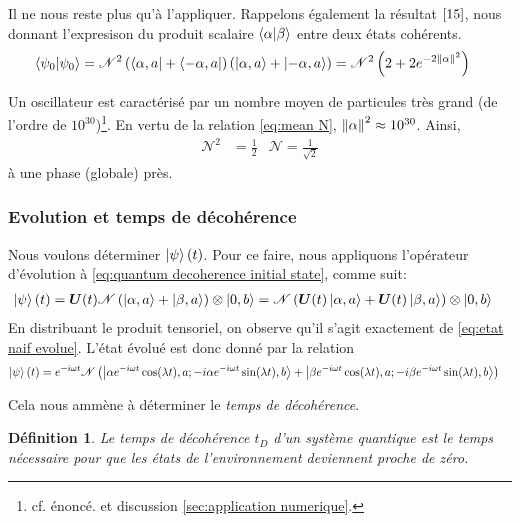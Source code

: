 \documentclass[11pt,oneside,a4paper]{article}
\newtheorem{definition}[theorem]{Définition}
\begin{document}
Il ne nous reste plus qu'à l'appliquer. Rappelons également la résultat $\eqref{15}$, nous donnant l'expresison du produit scalaire $\braket{\alpha}{\beta}$ entre deux états cohérents.
\begin{align*}
  \braket{\psi_0} &= \mathcal{N}^2\left(\bra{\alpha,a}+\bra{-\alpha,a}\right)\left(\ket{\alpha,a}+\ket{-\alpha,a}\right) = \mathcal{N}^2\left(2+2e^{-2\norm{\alpha}^2}\right)
\end{align*}

Un oscillateur est caractérisé par un nombre moyen de particules très grand (de l'ordre de $10^{30}$)\footnote{cf. énoncé. et discussion \ref{sec:application numerique}.}. En vertu de la relation \eqref{eq:mean N}, $\norm{\alpha}^2 \approx 10^{30}$. Ainsi, 
\begin{align}
  \mathcal{N}^2 &= \frac{1}{2} &\mathcal{N} = \frac{1}{\sqrt{2}}
\end{align} 
à une phase (globale) près.

\subsubsection{Evolution et temps de décohérence}\label{sec:evolution et temps de decoherence}

Nous voulons déterminer $\ket{\psi}(t)$. Pour ce faire, nous appliquons l'opérateur d'évolution à \eqref{eq:quantum decoherence initial state}, comme suit:
\begin{align*}
  \ket{\psi}(t) &= \bm{U}(t)\mathcal{N}\left(\ket{\alpha,a}+\ket{\beta,a}\right)\otimes\ket{0,b} = \mathcal{N}\left(\bm{U}(t)\ket{\alpha,a}+\bm{U}(t)\ket{\beta,a}\right)\otimes\ket{0,b}
\end{align*}
En distribuant le produit tensoriel, on observe qu'il s'agit exactement de \eqref{eq:etat naif evolue}. L'état évolué est donc donné par la relation
\begin{align}
  \ket{\psi}(t) &= e^{-i\omega t}\mathcal{N}\left(\ket{\alpha e^{-i\omega t}\cos(\lambda t),a;-i\alpha e^{-i\omega t}\sin(\lambda t),b}+\ket{\beta e^{-i\omega t}\cos(\lambda t),a;-i\beta e^{-i\omega t}\sin(\lambda t),b}\right)
\end{align}

Cela nous ammène à déterminer le \emph{temps de décohérence}.
\begin{definition}
  Le temps de décohérence $t_D$ d'un système quantique est le temps nécessaire pour que les états de l'environnement deviennent proche de zéro.\label{def:temps decoherence} 
\end{definition}
\end{document}

